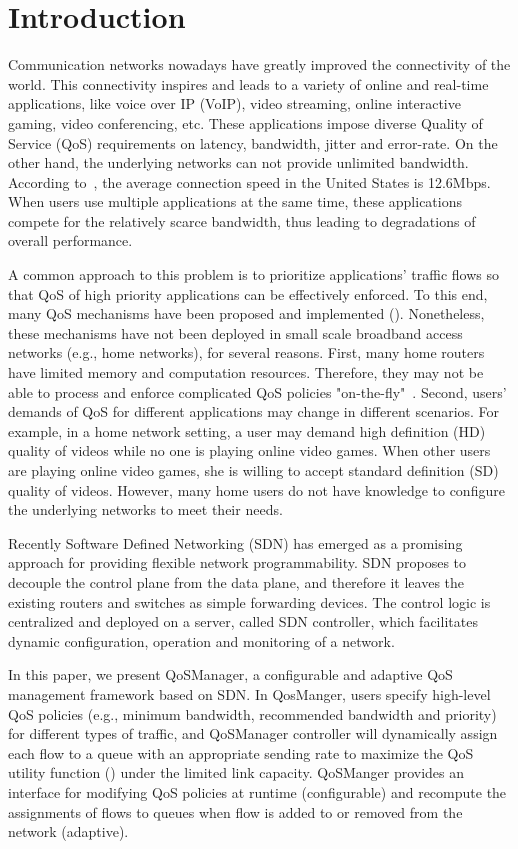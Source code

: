 \section{Introduction}
\label{sect:intro}

Communication networks nowadays have greatly improved the connectivity of the world. This connectivity
inspires and leads to a variety of online and real-time applications, like voice over IP (VoIP), video
streaming, online interactive gaming, video conferencing, etc. These applications impose diverse Quality
of Service (QoS) requirements on latency, bandwidth, jitter and error-rate. On the other hand, the
underlying networks can not provide unlimited bandwidth. According to~\cite{akamai}, the average
connection speed in the United States is 12.6Mbps. When users use multiple applications at the same time,
these applications compete for the relatively scarce bandwidth, thus leading to degradations of overall
performance.

A common approach to this problem is to prioritize applications' traffic flows so that QoS of high
priority applications can be effectively enforced. To this end, many QoS mechanisms have been proposed and
implemented (). Nonetheless, these mechanisms have not been deployed in small scale broadband
access networks (e.g., home networks), for several reasons. First, many home routers have limited memory and
computation resources. Therefore, they may not be able to process and enforce complicated QoS policies
"on-the-fly"~\cite{But_Comm2018}. Second, users' demands of QoS for different applications may change in different
scenarios. For example, in a home network setting, a user may demand high definition (HD) quality of videos while
no one is playing online video games. When other users are playing online video games, she is willing to accept
standard definition (SD) quality of videos. However, many home users do not have knowledge to configure the
underlying networks to meet their needs.

Recently Software Defined Networking (SDN) has emerged as a promising approach for providing flexible network
programmability. SDN proposes to decouple the control plane from the data plane, and therefore it leaves the
existing routers and switches as simple forwarding devices. The control logic is centralized and deployed on a
server, called SDN controller, which facilitates dynamic configuration, operation and monitoring of a network.

In this paper, we present QoSManager, a configurable and adaptive QoS management framework based on SDN. In
QosManger, users specify high-level QoS policies (e.g., minimum bandwidth, recommended bandwidth and priority)
for different types of traffic, and QoSManager controller will dynamically assign each flow to a queue with an
appropriate sending rate to maximize the QoS utility function () under the limited link capacity.
QoSManger provides an interface for modifying QoS policies at runtime (configurable) and recompute the assignments
of flows to queues when flow is added to or removed from the network (adaptive).

